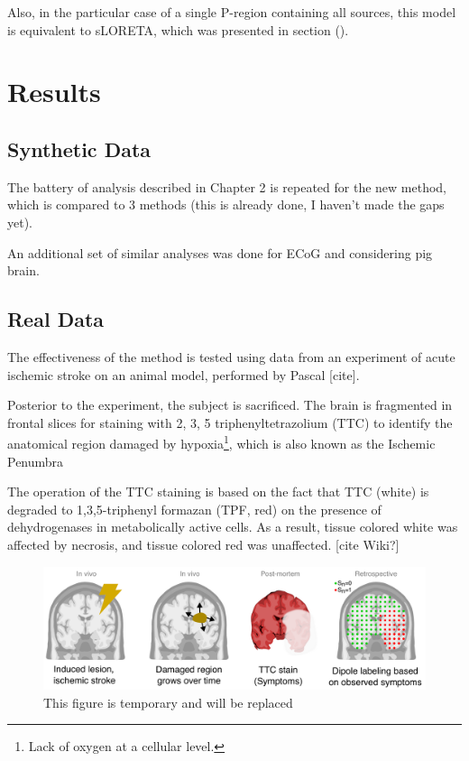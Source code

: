 Also, in the particular case of a single P-region containing all sources, this model is equivalent to sLORETA, which was presented in section ().



\section{Results}

\subsection{Synthetic Data}

The battery of analysis described in Chapter 2 is repeated for the new method, which is compared to 3 methods (this is already done, I haven't made the gaps yet).

An additional set of similar analyses was done for ECoG and considering pig brain.

\subsection{Real Data}

The effectiveness of the method is tested using data from an experiment 
of acute ischemic stroke on an animal model, performed by
Pascal [cite].

Posterior to the experiment, the subject is sacrificed.
%
The brain is fragmented in frontal slices for staining with
2, 3, 5 
triphenyltetrazolium (TTC)
to identify the anatomical region damaged by hypoxia\footnote{Lack of oxygen at a cellular level.}, which is also known as the Ischemic Penumbra

The operation of the TTC staining is based on the fact that TTC (white) 
is degraded to 1,3,5-triphenyl formazan (TPF, red)
on the presence of dehydrogenases in metabolically active cells.
%
As a result, tissue colored white was affected by necrosis, and tissue colored red was unaffected. 
[cite Wiki?]

\begin{figure}
\centering
\includegraphics[width=\linewidth]{./img_dev/motivation.pdf}
\caption{This figure is temporary and will be replaced}
\end{figure}

